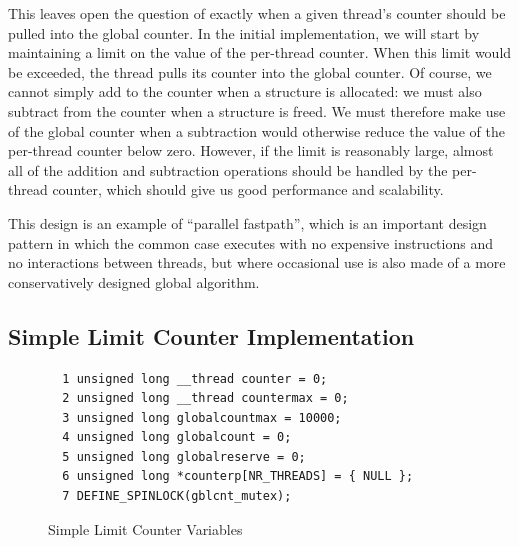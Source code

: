 This leaves open the question of exactly when a given thread's counter
should be pulled into the global counter.
In the initial implementation, we will start by maintaining a limit on
the value of the per-thread counter.
When this limit would be exceeded, the thread pulls its counter into the
global counter.
Of course, we cannot simply add to the counter when a structure is
allocated: we must also subtract from the counter when a structure is
freed.
We must therefore make use of the global counter when a subtraction would
otherwise reduce the value of the per-thread counter below zero.
However, if the limit is reasonably large, almost all of the addition
and subtraction operations should be handled by the per-thread counter,
which should give us good performance and scalability.

This design is an example of ``parallel fastpath'', which is an important
design pattern in which the common case executes with no expensive
instructions and no interactions between threads, but where occasional
use is also made of a more conservatively designed global algorithm.

\subsection{Simple Limit Counter Implementation}
\label{sec:count:Simple Limit Counter Implementation}

\begin{figure}[tbp]
{ \scriptsize
\begin{verbatim}
  1 unsigned long __thread counter = 0;
  2 unsigned long __thread countermax = 0;
  3 unsigned long globalcountmax = 10000;
  4 unsigned long globalcount = 0;
  5 unsigned long globalreserve = 0;
  6 unsigned long *counterp[NR_THREADS] = { NULL };
  7 DEFINE_SPINLOCK(gblcnt_mutex);
\end{verbatim}
}
\caption{Simple Limit Counter Variables}
\label{fig:count:Simple Limit Counter Variables}
\end{figure}

